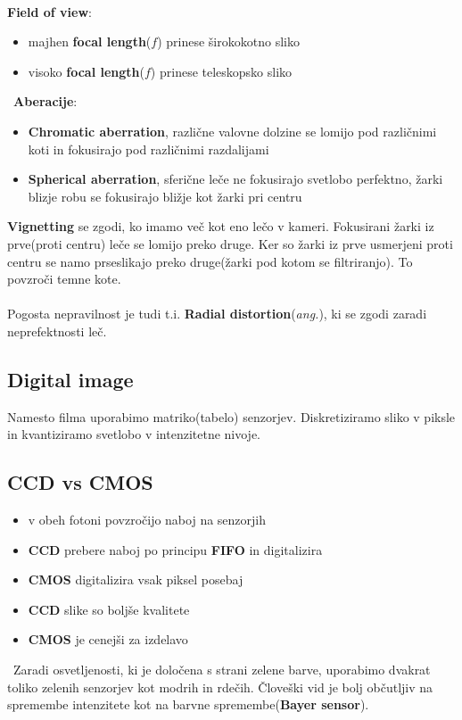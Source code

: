 \documentclass[11pt]{article}
\begin{document}
\\
\textbf{Field of view}:
\begin{itemize}
\item majhen \textbf{focal length}($f$) prinese \v{s}irokokotno sliko
\item visoko \textbf{focal length}($f$) prinese teleskopsko sliko
\end{itemize}
\
\textbf{Aberacije}:
\begin{itemize}
\item \textbf{Chromatic aberration}, razli\v{c}ne valovne dolzine se lomijo pod razli\v{c}nimi koti in fokusirajo pod razli\v{c}nimi razdalijami
\item \textbf{Spherical aberration}, sferi\v{c}ne le\v{c}e ne fokusirajo svetlobo perfektno, \v{z}arki blizje robu se fokusirajo bli\v{z}je kot \v{z}arki pri centru
\end{itemize}

\newpage

\textbf{Vignetting} se zgodi, ko imamo ve\v{c} kot eno le\v{c}o v kameri. Fokusirani \v{z}arki iz prve(proti centru) le\v{c}e se lomijo preko druge. Ker so \v{z}arki iz prve usmerjeni proti centru se namo prseslikajo preko druge(\v{z}arki pod kotom se filtriranjo). To povzro\v{c}i temne kote.\\
\\
Pogosta nepravilnost je tudi t.i. \textbf{Radial distortion}(\textit{ang.}), ki se zgodi zaradi neprefektnosti le\v{c}.

\subsection{Digital image}
Namesto filma uporabimo matriko(tabelo) senzorjev. Diskretiziramo sliko v piksle in kvantiziramo svetlobo v intenzitetne nivoje.

\subsection{CCD vs CMOS}
\begin{itemize}
\item v obeh fotoni povzro\v{c}ijo naboj na senzorjih
\item \textbf{CCD} prebere naboj po principu \textbf{FIFO} in digitalizira
\item \textbf{CMOS} digitalizira vsak piksel posebaj
\item \textbf{CCD} slike so bolj\v{s}e kvalitete
\item \textbf{CMOS} je cenej\v{s}i za izdelavo
\end{itemize}
\
Zaradi osvetljenosti, ki je dolo\v{c}ena s strani zelene barve, uporabimo dvakrat toliko zelenih senzorjev kot modrih in rde\v{c}ih. \v{C}love\v{s}ki vid je bolj ob\v{c}utljiv na spremembe intenzitete kot na barvne spremembe(\textbf{Bayer sensor}).
\end{document}
